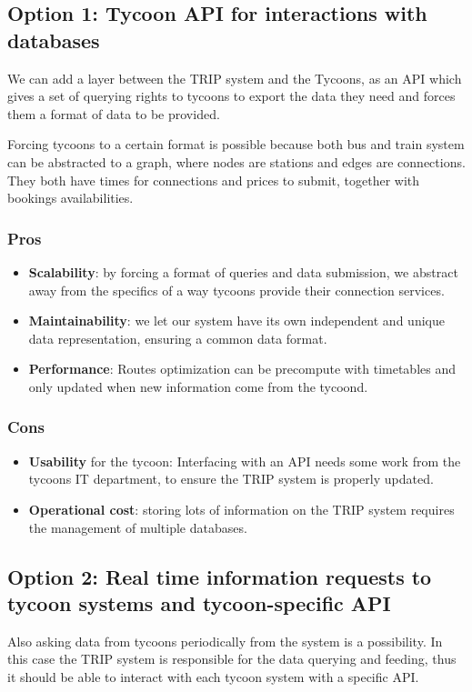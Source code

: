 \subsection*{Option 1: Tycoon API for interactions with databases}

We can add a layer between the TRIP system and the Tycoons, as an API which gives a set of querying rights to tycoons to export the data they need and forces them a format of data to be provided.

Forcing tycoons to a certain format is possible because both bus and train system can be abstracted to a graph, where nodes are stations and edges are connections.
They both have times for connections and prices to submit, together with bookings availabilities.
\subsubsection*{Pros}
\begin{itemize}[noitemsep]
    \item \textbf{Scalability}: by forcing a format of queries and data submission, we abstract away from the specifics of a way tycoons provide their connection services.
    \item \textbf{Maintainability}: we let our system have its own independent and unique data representation, ensuring a common data format.
    \item \textbf{Performance}: Routes optimization can be precompute with timetables and only updated when new information come from the tycoond.
\end{itemize}
\subsubsection*{Cons}
\begin{itemize}[noitemsep]
    \item \textbf{Usability} for the tycoon: Interfacing with an API needs some work from the tycoons IT department, to ensure the TRIP system is properly updated.
    \item \textbf{Operational cost}: storing lots of information on the TRIP system requires the management of multiple databases.
\end{itemize}


\subsection*{Option 2: Real time information requests to tycoon systems and tycoon-specific API}
Also asking data from tycoons periodically from the system is a possibility. In this case the TRIP system is
responsible for the data querying and feeding, thus it should be able to interact with each tycoon system with a specific API.
